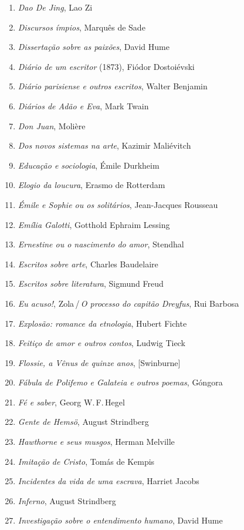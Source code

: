 \begin{enumerate}
\item \textit{Dao De Jing}, Lao Zi
\item \textit{Discursos ímpios}, Marquês de Sade
\item \textit{Dissertação sobre as paixões}, David Hume
\item \textit{Diário de um escritor} (1873), Fiódor Dostoiévski
\item \textit{Diário parisiense e outros escritos}, Walter Benjamin
\item \textit{Diários de Adão e Eva}, Mark Twain
\item \textit{Don Juan}, Molière
\item \textit{Dos novos sistemas na arte}, Kazimir Maliévitch
\item \textit{Educação e sociologia}, Émile Durkheim
\item \textit{Elogio da loucura}, Erasmo de Rotterdam
\item \textit{Émile e Sophie ou os solitários}, Jean-Jacques Rousseau 
\item \textit{Emília Galotti}, Gotthold Ephraim Lessing
\item \textit{Ernestine ou o nascimento do amor}, Stendhal
\item \textit{Escritos sobre arte}, Charles Baudelaire
\item \textit{Escritos sobre literatura}, Sigmund Freud
\item \textit{Eu acuso!}, Zola\,/\,\textit{O processo do capitão Dreyfus}, Rui Barbosa
\item \textit{Explosão: romance da etnologia}, Hubert Fichte
\item \textit{Feitiço de amor e outros contos}, Ludwig Tieck
\item \textit{Flossie, a Vênus de quinze anos}, [Swinburne]
\item \textit{Fábula de Polifemo e Galateia e outros poemas}, Góngora
\item \textit{Fé e saber}, Georg W.\,F.\,Hegel
\item \textit{Gente de Hemsö}, August Strindberg 
\item \textit{Hawthorne e seus musgos}, Herman Melville
\item \textit{Imitação de Cristo}, Tomás de Kempis
\item \textit{Incidentes da vida de uma escrava}, Harriet Jacobs
\item \textit{Inferno}, August Strindberg
\item \textit{Investigação sobre o entendimento humano}, David Hume

\end{enumerate}
